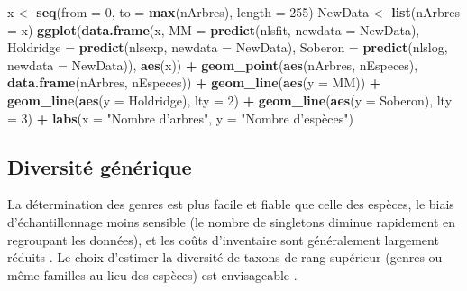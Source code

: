 \documentclass[
  11pt,
  french,
  a4paper,
  extrafontsizes,onecolumn,openright
  ]{memoir}
\newenvironment{Shaded}{\begin{snugshade}}{\end{snugshade}}
\newcommand{\DataTypeTok}[1]{\textcolor[rgb]{0.13,0.29,0.53}{#1}}
\newcommand{\DecValTok}[1]{\textcolor[rgb]{0.00,0.00,0.81}{#1}}
\newcommand{\KeywordTok}[1]{\textcolor[rgb]{0.13,0.29,0.53}{\textbf{#1}}}
\newcommand{\NormalTok}[1]{#1}
\newcommand{\OperatorTok}[1]{\textcolor[rgb]{0.81,0.36,0.00}{\textbf{#1}}}
\newcommand{\StringTok}[1]{\textcolor[rgb]{0.31,0.60,0.02}{#1}}
\begin{document}
\begin{Shaded}
\begin{Highlighting}[]
\NormalTok{x <-}\StringTok{ }\KeywordTok{seq}\NormalTok{(}\DataTypeTok{from =} \DecValTok{0}\NormalTok{, }\DataTypeTok{to =} \KeywordTok{max}\NormalTok{(nArbres), }\DataTypeTok{length =} \DecValTok{255}\NormalTok{)}
\NormalTok{NewData <-}\StringTok{ }\KeywordTok{list}\NormalTok{(}\DataTypeTok{nArbres =}\NormalTok{ x)}
\KeywordTok{ggplot}\NormalTok{(}\KeywordTok{data.frame}\NormalTok{(x, }
        \DataTypeTok{MM =} \KeywordTok{predict}\NormalTok{(nlsfit, }\DataTypeTok{newdata =}\NormalTok{ NewData),}
        \DataTypeTok{Holdridge =} \KeywordTok{predict}\NormalTok{(nlsexp, }\DataTypeTok{newdata =}\NormalTok{ NewData),}
        \DataTypeTok{Soberon =} \KeywordTok{predict}\NormalTok{(nlslog, }\DataTypeTok{newdata =}\NormalTok{ NewData)), }
    \KeywordTok{aes}\NormalTok{(x)) }\OperatorTok{+}
\StringTok{  }\KeywordTok{geom_point}\NormalTok{(}\KeywordTok{aes}\NormalTok{(nArbres, nEspeces), }\KeywordTok{data.frame}\NormalTok{(nArbres, nEspeces)) }\OperatorTok{+}
\StringTok{  }\KeywordTok{geom_line}\NormalTok{(}\KeywordTok{aes}\NormalTok{(}\DataTypeTok{y =}\NormalTok{ MM)) }\OperatorTok{+}
\StringTok{  }\KeywordTok{geom_line}\NormalTok{(}\KeywordTok{aes}\NormalTok{(}\DataTypeTok{y =}\NormalTok{ Holdridge), }\DataTypeTok{lty =} \DecValTok{2}\NormalTok{) }\OperatorTok{+}
\StringTok{  }\KeywordTok{geom_line}\NormalTok{(}\KeywordTok{aes}\NormalTok{(}\DataTypeTok{y =}\NormalTok{ Soberon), }\DataTypeTok{lty =} \DecValTok{3}\NormalTok{) }\OperatorTok{+}
\StringTok{  }\KeywordTok{labs}\NormalTok{(}\DataTypeTok{x =} \StringTok{"Nombre d'arbres"}\NormalTok{, }\DataTypeTok{y =} \StringTok{"Nombre d'espèces"}\NormalTok{)}
\end{Highlighting}
\end{Shaded}

\normalsize

\hypertarget{diversituxe9-guxe9nuxe9rique}{%
\subsection{Diversité générique}\label{diversituxe9-guxe9nuxe9rique}}

La détermination des genres est plus facile et fiable que celle des espèces, le biais d'échantillonnage moins sensible (le nombre de singletons diminue rapidement en regroupant les données), et les coûts d'inventaire sont généralement largement réduits \autocite{Balmford1996b}.
Le choix d'estimer la diversité de taxons de rang supérieur (genres ou même familles au lieu des espèces) est envisageable \autocite{Williams1994}.
\end{document}
